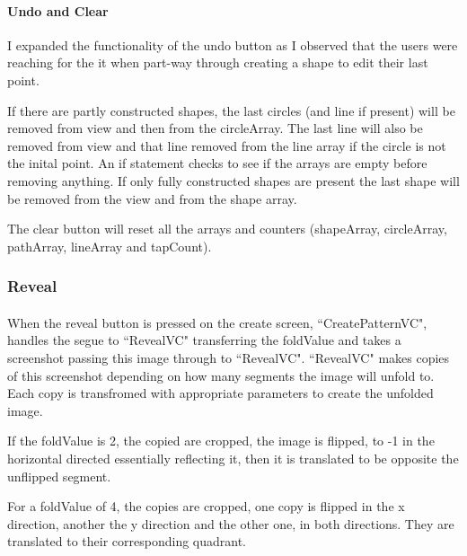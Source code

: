 \documentclass[11pt]{article}
\begin{document}
            
             \paragraph{Undo and Clear}
              I expanded the functionality of the undo button as I observed that the users were reaching for the it when part-way through creating a shape to edit their last point. 
              
              If there are partly constructed shapes, the last circles (and line if present) will be removed from view and then from the circleArray. The last line will also be removed from view and that line removed from the line array if the circle is not the inital point. An if statement checks to see if the arrays are empty before removing anything.
              If only fully constructed shapes are present the last shape will be removed from the view and from the shape array. 
              
              The clear button will reset all the arrays and counters (shapeArray, circleArray, pathArray, lineArray and tapCount).
    

    \subsubsection{Reveal}
            \paragraph{}
            When the reveal button is pressed on the create screen, ``CreatePatternVC", handles the segue to ``RevealVC" transferring the foldValue and takes a screenshot passing this image through to ``RevealVC". ``RevealVC" makes copies of this screenshot depending on how many segments the image will unfold to. Each copy is transfromed with appropriate parameters to create the unfolded image. 
            
            If the foldValue is 2, the copied are cropped, the image is flipped, to -1 in the horizontal directed essentially reflecting it, then it is translated to be opposite the unflipped segment. 
            
            For a foldValue of 4, the copies are cropped, one copy is flipped in the x direction, another the y direction and the other one, in both directions. They are translated to their corresponding quadrant. 
            
\end{document}
